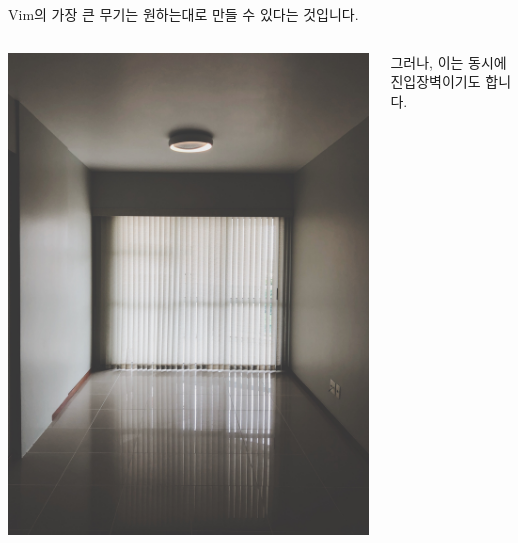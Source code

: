 \documentclass{beamer}
\begin{document}
\begin{frame}[plain]{}
  Vim의 가장 큰 무기는 \alert{원하는대로 만들 수 있다는 것}입니다.\\\pause\vpad
  \begin{columns}
    \begin{column}{0.5\linewidth}
      \includegraphics[width=\linewidth]{figures/empty-room}
    \end{column}
    \pause
    \begin{column}{0.5\linewidth}
      \centering
      그러나, 이는 동시에 진입장벽이기도 합니다.\\\pause

\end{column}
\end{columns}
\end{frame}
\end{document}
